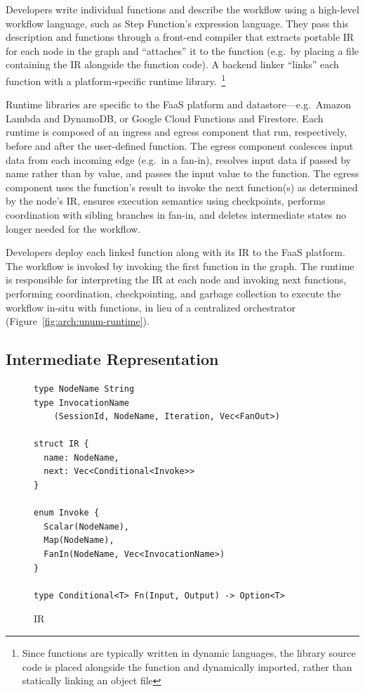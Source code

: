 Developers write individual functions and describe the workflow using a
high-level workflow language, such as Step Function's expression language. They
pass this description and functions through a front-end \name{} compiler that
extracts portable \name{} IR for each node in the graph and ``attaches'' it to
the function (e.g.\ by placing a file containing the IR alongside the function
code). A backend \name{} linker ``links'' each function with a
platform-specific \name{} runtime library.~\footnote{Since functions are
typically written in dynamic languages, the \name{} library source code is
placed alongside the function and dynamically imported, rather than statically
linking an object file}

Runtime libraries are specific to the FaaS platform and datastore---e.g.\ Amazon
Lambda and DynamoDB, or Google Cloud Functions and Firestore. Each runtime is
composed of an ingress and egress component that run, respectively, before and
after the user-defined function. The egress component coalesces input data from
each incoming edge (e.g.\ in a fan-in), resolves input data if passed by name
rather than by value, and passes the input value to the function. The egress
component uses the function's result to invoke the next function(s) as
determined by the node's IR, ensures execution semantics using checkpoints,
performs coordination with sibling branches in fan-in, and deletes intermediate
states no longer needed for the workflow.

Developers deploy each linked function along with its IR to the FaaS platform.
The workflow is invoked by invoking the first function in the graph.  The
\name{} runtime is responsible for interpreting the \name{} IR at each node and
invoking next functions, performing coordination, checkpointing, and garbage
collection to execute the workflow in-situ with functions, in lieu of a
centralized orchestrator (Figure~\ref{fig:arch:unum-runtime}).

\subsection{\name{} Intermediate Representation}\label{sec:design:ir}


\begin{figure}[t!]
    \centering
    \begin{verbatim}
type NodeName String
type InvocationName
    (SessionId, NodeName, Iteration, Vec<FanOut>)

struct IR {
  name: NodeName,
  next: Vec<Conditional<Invoke>>
}

enum Invoke {
  Scalar(NodeName),
  Map(NodeName),
  FanIn(NodeName, Vec<InvocationName>)
}

type Conditional<T> Fn(Input, Output) -> Option<T>
    \end{verbatim}
    \caption{\name{} IR}
    \label{fig:design:irschema}
\end{figure}

